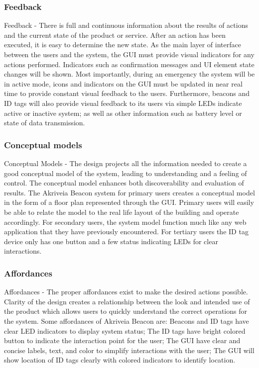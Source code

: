 \subsubsection{Feedback}
\medskip
Feedback - There is full and continuous information about the results of actions and the current state of the product or service. After an action has been executed, it is easy to determine the new state. As the main layer of interface between the users and the system, the GUI must provide visual indicators for any actions performed. Indicators such as confirmation messages and UI element state changes will be shown. Most importantly, during an emergency the system will be in active mode, icons and indicators on the GUI must be updated in near real time to provide constant visual feedback to the users. Furthermore, beacons and ID tags will also provide visual feedback to its users via simple LEDs indicate active or inactive system; as well as other information such as battery level or state of data transmission. 
\pagebreak


\subsubsection{Conceptual models}
Conceptual Models - The design projects all the information needed to create a good conceptual model of the system, leading to understanding and a feeling of control. The conceptual model enhances both discoverability and evaluation of results. The Akriveia Beacon system for primary users creates a conceptual model in the form of a floor plan represented through the GUI. Primary users will easily be able to relate the model to the real life layout of the building and operate accordingly. For secondary users, the system model function much like any web application that they have previously encountered. For tertiary users the ID tag device only has one button and a few status indicating LEDs for clear interactions.
\medskip


\subsubsection{Affordances}
Affordances - The proper affordances exist to make the desired actions possible. Clarity of the design creates a relationship between the look and intended use of the product which allows users to quickly understand the correct operations for the system. Some affordances of Akriveia Beacon are: Beacons and ID tags have clear LED indicators to display system status; The ID tags have bright colored button to indicate the interaction point for the user; The GUI have clear and concise labels, text, and color to simplify interactions with the user; The GUI will show location of ID tags clearly with colored indicators to identify location.
\medskip


